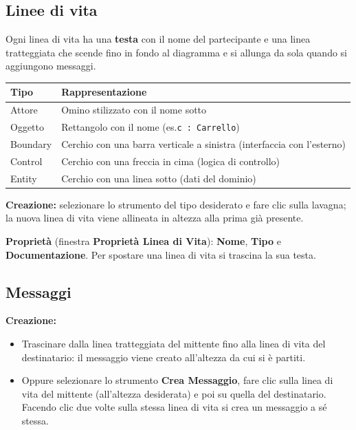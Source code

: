 \documentclass[a4paper,11pt]{article}
\newcommand{\uielement}[1]{\textbf{#1}}
\begin{document}
\subsection{Linee di vita}

Ogni linea di vita ha una \textbf{testa} con il nome del partecipante e una linea tratteggiata che
scende fino in fondo al diagramma e si allunga da sola quando si aggiungono messaggi.

\begin{center}
\begin{tabular}{@{}ll@{}}
  \toprule
  \textbf{Tipo} & \textbf{Rappresentazione} \\
  \midrule
  Attore   & Omino stilizzato con il nome sotto \\
  Oggetto  & Rettangolo con il nome (es.\@ \texttt{c : Carrello}) \\
  Boundary & Cerchio con una barra verticale a sinistra (interfaccia con l'esterno) \\
  Control  & Cerchio con una freccia in cima (logica di controllo) \\
  Entity   & Cerchio con una linea sotto (dati del dominio) \\
  \bottomrule
\end{tabular}
\end{center}

\textbf{Creazione:} selezionare lo strumento del tipo desiderato e fare clic sulla lavagna; la
nuova linea di vita viene allineata in altezza alla prima già presente.

\textbf{Proprietà} (finestra \uielement{Proprietà Linea di Vita}): \textbf{Nome}, \textbf{Tipo}
e \textbf{Documentazione}. Per spostare una linea di vita si trascina la sua testa.

\subsection{Messaggi}

\textbf{Creazione:}
\begin{itemize}
  \item Trascinare dalla linea tratteggiata del mittente fino alla linea di vita del destinatario:
        il messaggio viene creato all'altezza da cui si è partiti.
  \item Oppure selezionare lo strumento \uielement{Crea Messaggio}, fare clic sulla linea di vita
        del mittente (all'altezza desiderata) e poi su quella del destinatario. Facendo clic due
        volte sulla stessa linea di vita si crea un messaggio a sé stessa.
\end{itemize}
\end{document}
